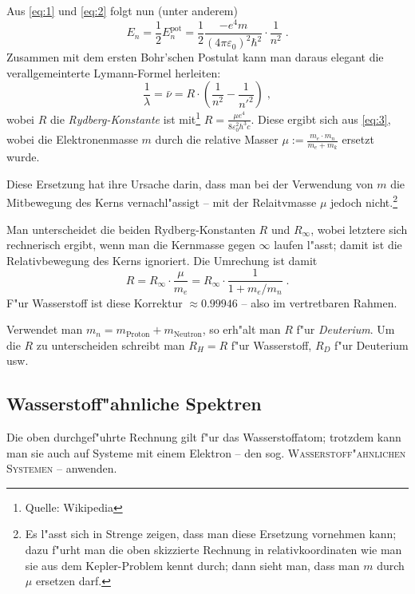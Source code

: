 \documentclass[a4paper,draft]{article}
\begin{document}
\abs
Aus \eqref{eq:1} und \eqref{eq:2} folgt nun (unter anderem)
\begin{equation}
  \label{eq:3}
\boxed{  E_n = \frac{1}{2} E_n^\text{pot} =\frac{1}{2} \frac{-e^4
    m}{(4\pi\varepsilon_0)^2 \hbar^2} \cdot \frac{1}{n^2} } \;.
\end{equation}
Zusammen mit dem ersten Bohr'schen Postulat kann man daraus elegant
die verallgemeinterte Lymann-Formel herleiten:
\begin{equation}
  \label{eq:4}
  \frac{1}{\lambda} = \bar \nu = R \cdot \left ( \frac{1}{n^2} -
    \frac{1}{{n'}^2}\right )  \;,
\end{equation}
wobei $R$ die \emph{Rydberg-Konstante} ist mit\footnote{Quelle: Wikipedia} $R = \frac{\mu
  e^4}{8\varepsilon_0^2 h^3 c}$. Diese ergibt sich aus \eqref{eq:3},
wobei die Elektronenmasse $m$ durch die relative Masser $\mu :=
\frac{m_e \cdot m_n}{m_e + m_k}$ ersetzt wurde.

\abs
Diese Ersetzung hat ihre Ursache darin, dass man bei der Verwendung
von $m$ die Mitbewegung des Kerns vernachl"assigt -- mit der
Relaitvmasse $\mu$ jedoch nicht.\footnote{Es l"asst sich in Strenge
  zeigen, dass man diese Ersetzung vornehmen kann; dazu f"urht man die
oben skizzierte Rechnung in relativkoordinaten wie man sie aus dem
Kepler-Problem kennt durch; dann sieht man, dass man $m$ durch $\mu$
ersetzen darf.}

Man unterscheidet die beiden Rydberg-Konstanten $R$ und $R_\infty$,
wobei letztere sich rechnerisch ergibt, wenn man die Kernmasse gegen
$\infty$ laufen l"asst; damit ist die Relativbewegung des Kerns
ignoriert. Die Umrechung ist damit
\begin{equation*}
  R = R_{\infty} \cdot \frac{\mu}{m_e} = R_\infty \cdot
  \frac{1}{1+m_e/m_n} \;.
\end{equation*}
F"ur Wasserstoff ist diese Korrektur $\approx 0.99946$ -- also im
vertretbaren Rahmen.

Verwendet man  $m_n = m_\text{Proton} + m_\text{Neutron}$, so erh"alt
man $R$ f"ur \emph{Deuterium}. Um die $R$ zu unterscheiden schreibt
man $R_H = R$ f"ur Wasserstoff, $R_D$ f"ur Deuterium usw.



\subsection{Wasserstoff"ahnliche Spektren}
\label{sec:wasserstoffahnliche_spektren}

Die oben durchgef"uhrte Rechnung gilt f"ur das Wasserstoffatom;
trotzdem kann man sie auch auf Systeme mit einem Elektron -- den
sog. \textsc{Wasserstoff"ahnlichen Systemen} -- anwenden.
\end{document}
